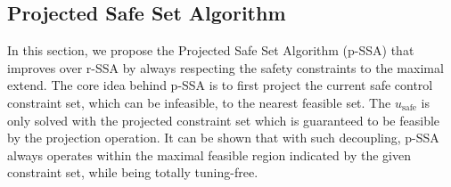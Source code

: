 \subsection{Projected Safe Set Algorithm}\label{sec:pssa}



In this section, we propose the Projected Safe Set Algorithm (p-SSA) that improves over r-SSA by always respecting the safety constraints to the maximal extend.
The core idea behind p-SSA is to first project the current safe control constraint set, which can be infeasible, to the nearest feasible set.
The $u_\mathrm{safe}$ is only solved with the projected constraint set which is guaranteed to be feasible by the projection operation.
It can be shown that with such decoupling, p-SSA always operates within the maximal feasible region indicated by the given constraint set, while being totally tuning-free.

